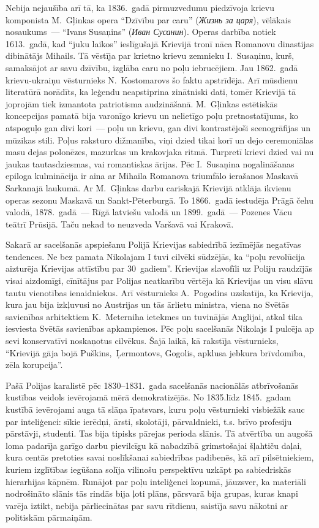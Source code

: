 \documentclass[twoside,a5paper,12pt,fleqn,openany]{extbook}
\newcommand{\rutxti}[1]{\textit{\textrussian{#1}}}
\begin{document}
Nebija nejaušība arī tā, ka 1836.~gadā pirmuzvedumu piedzīvoja krievu komponista M.~Gļinkas opera ``Dzīvību par caru'' (\rutxti{Жизнь за царя}), vēlākais nosaukums~--- ``Ivans Susaņins'' (\rutxti{Иван Сусанин}). Operas darbība notiek 1613.~gadā, kad ``juku laikos'' ieslīgušajā Krievijā tronī nāca Romanovu dinastijas dibinātājs Mihails. Tā vēstīja par krietno krievu zemnieku I.~Susaņinu, kurš, samaksājot ar savu dzīvību, izglāba caru no poļu iebrucējiem. Jau 1862.~gadā krievu-ukraiņu vēsturnieks N.~Kostomarovs šo faktu apstrīdēja. Arī mūsdienu literatūrā norādīts, ka leģendu neapstiprina zinātniski dati, tomēr Krievijā tā joprojām tiek izmantota patriotisma audzināšanā. M.~Gļinkas estētiskās koncepcijas pamatā bija varonīgo krievu un nelietīgo poļu pretnostatījums, ko atspoguļo gan divi kori~--- poļu un krievu, gan divi kontrastējoši scenogrāfijas un mūzikas stili. Poļus raksturo dižmanība, viņi dzied tikai korī un dejo ceremoniālas masu dejas polonēzes, mazurkas un krakovjaka ritmā. Turpretī krievi dzied vai nu jaukas tautasdziesmas, vai romantiskas ārijas. Pēc I.~Susaņina nogalināšanas epiloga kulminācija ir aina ar Mihaila Romanova triumfālo ierašanos Maskavā Sarkanajā laukumā. Ar M.~Gļinkas darbu cariskajā Krievijā atklāja ikvienu operas sezonu Maskavā un Sankt-Pēterburgā. To 1866.~gadā iestudēja Prāgā čehu valodā, 1878.~gadā~--- Rīgā latviešu valodā un 1899.~gadā~--- Pozenes Vācu teātrī Prūsijā. Taču nekad to neuzveda Varšavā vai Krakovā.

Sakarā ar sacelšanās apspiešanu Polijā Krievijas sabiedrībā iezīmējās negatīvas tendences. Ne bez pamata Nikolajam I tuvi cilvēki sūdzējās, ka ``poļu revolūcija aizturēja Krievijas attīstību par 30~gadiem''. Krievijas slavofīli uz Poliju raudzījās visai aizdomīgi, cīnītājus par Polijas neatkarību vērtēja kā Krievijas un visu slāvu tautu vienotības ienaidniekus. Arī vēsturnieks A.~Pogodins uzskatīja, ka Krievija, kura jau bija izkļuvusi no Austrijas un tās ārlietu ministra, viena no Svētās savienības arhitektiem K.~Meterniha ietekmes un tuvinājās Anglijai, atkal tika iesviesta Svētās savienības apkampienos. Pēc poļu sacelšanās Nikolajs I pulcēja ap sevi konservatīvi noskaņotus cilvēkus. Šajā laikā, kā rakstīja vēsturnieks, ``Krievijā gāja bojā Puškins,~Ļermontovs, Gogolis, apklusa jebkura brīvdomība, zēla korupcija''.

Pašā Polijas karalistē pēc 1830--1831.~gada sacelšanās nacionālās atbrīvošanās kustības veidols ievērojamā mērā demokratizējās. No 1835.līdz 1845.~gadam kustībā ievērojami auga tā slāņa īpatsvars, kuru poļu vēsturnieki visbiežāk sauc par inteliģenci: sīkie ierēdņi, ārsti, skolotāji, pārvaldnieki, t.s. brīvo profesiju pārstāvji, studenti. Tas bija tipisks pārejas perioda slānis. Tā atvērtība un augošā loma padarīja garīgo darbu pievilcīgu kā nabadzībā grimstošajai šļahtiču daļai, kura centās pretoties savai noslīkšanai sabiedrības padibenēs, kā arī pilsētniekiem, kuriem izglītības iegūšana solīja vilinošu perspektīvu uzkāpt pa sabiedriskās hierarhijas kāpnēm. Runājot par poļu inteliģenci kopumā, jāuzsver, ka materiāli nodrošināto slānis tās rindās bija ļoti plāns, pārsvarā bija grupas, kuras knapi varēja iztikt, nebija pārliecinātas par savu rītdienu, saistīja savu nākotni ar politiskām pārmaiņām.
\end{document}
